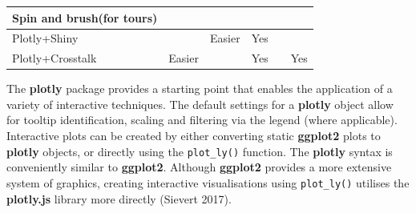 \documentclass[]{book}
\theoremstyle{definition}
\theoremstyle{definition}
\theoremstyle{definition}
\theoremstyle{remark}
\begin{document}
\begin{longtable}[]{@{}lccccc@{}}
\begin{minipage}[b]{0.13\columnwidth}
Spin and brush(for tours)\strut
\end{minipage}\tabularnewline
\midrule
\endhead
\begin{minipage}[t]{0.11\columnwidth}\raggedright\strut
Plotly+Shiny\strut
\end{minipage} & \begin{minipage}[t]{0.20\columnwidth}\centering\strut
\strut
\end{minipage} & \begin{minipage}[t]{0.13\columnwidth}\centering\strut
Easier\strut
\end{minipage} & \begin{minipage}[t]{0.12\columnwidth}\centering\strut
Yes\strut
\end{minipage} & \begin{minipage}[t]{0.13\columnwidth}\centering\strut
\strut
\end{minipage} & \begin{minipage}[t]{0.13\columnwidth}\centering\strut
\strut
\end{minipage}\tabularnewline
\begin{minipage}[t]{0.11\columnwidth}\raggedright\strut
Plotly+Crosstalk\strut
\end{minipage} & \begin{minipage}[t]{0.20\columnwidth}\centering\strut
Easier\strut
\end{minipage} & \begin{minipage}[t]{0.13\columnwidth}\centering\strut
\strut
\end{minipage} & \begin{minipage}[t]{0.12\columnwidth}\centering\strut
Yes\strut
\end{minipage} & \begin{minipage}[t]{0.13\columnwidth}\centering\strut
\strut
\end{minipage} & \begin{minipage}[t]{0.13\columnwidth}\centering\strut
Yes\strut
\end{minipage}\tabularnewline
\bottomrule
\end{longtable}

The \textbf{plotly} package provides a starting point that enables the
application of a variety of interactive techniques. The default settings
for a \textbf{plotly} object allow for tooltip identification, scaling
and filtering via the legend (where applicable). Interactive plots can
be created by either converting static \textbf{ggplot2} plots to
\textbf{plotly} objects, or directly using the \texttt{plot\_ly()}
function. The \textbf{plotly} syntax is conveniently similar to
\textbf{ggplot2}. Although \textbf{ggplot2} provides a more extensive
system of graphics, creating interactive visualisations using
\texttt{plot\_ly()} utilises the \textbf{plotly.js} library more
directly (Sievert 2017).
\end{document}
